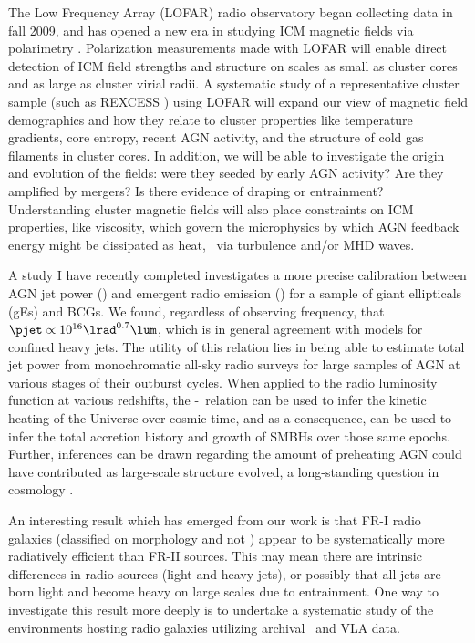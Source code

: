 \documentclass[11pt]{article}
\begin{document}
The Low Frequency Array (LOFAR) radio observatory began collecting
data in fall 2009, and has opened a new era in studying ICM magnetic
fields via polarimetry \cite{2009ASPC..407...33A}. Polarization
measurements made with LOFAR will enable direct detection of ICM field
strengths and structure on scales as small as cluster cores and as
large as cluster virial radii. A systematic study of a representative
cluster sample (such as REXCESS \cite{rexcess}) using LOFAR will
expand our view of magnetic field demographics and how they relate to
cluster properties like temperature gradients, core entropy, recent
AGN activity, and the structure of cold gas filaments in cluster
cores. In addition, we will be able to investigate the origin and
evolution of the fields: were they seeded by early AGN activity? Are
they amplified by mergers? Is there evidence of draping or
entrainment? Understanding cluster magnetic fields will also place
constraints on ICM properties, like viscosity, which govern the
microphysics by which AGN feedback energy might be dissipated as heat,
\eg\ via turbulence and/or MHD waves.

A study I have recently completed \cite{pjet} investigates a more
precise calibration between AGN jet power (\pjet) and emergent radio
emission (\lrad) for a sample of giant ellipticals (gEs) and BCGs. We
found, regardless of observing frequency, that $\pjet \propto 10^{16}
\lrad^{0.7} \lum$, which is in general agreement with models for
confined heavy jets. The utility of this relation lies in being able
to estimate total jet power from monochromatic all-sky radio surveys
for large samples of AGN at various stages of their outburst
cycles. When applied to the radio luminosity function at various
redshifts, the \pjet-\lrad\ relation can be used to infer the kinetic
heating of the Universe over cosmic time, and as a consequence, can be
used to infer the total accretion history and growth of SMBHs over
those same epochs. Further, inferences can be drawn regarding the
amount of preheating AGN could have contributed as large-scale
structure evolved, a long-standing question in cosmology
\cite{2001ApJ...555..597B}.

An interesting result which has emerged from our work is that FR-I
radio galaxies (classified on morphology and not \lrad) appear to be
systematically more radiatively efficient than FR-II sources. This may
mean there are intrinsic differences in radio sources (light and heavy
jets), or possibly that all jets are born light and become heavy on
large scales due to entrainment. One way to investigate this result
more deeply is to undertake a systematic study of the environments
hosting radio galaxies utilizing archival \chandra\ and VLA data.
\end{document}
